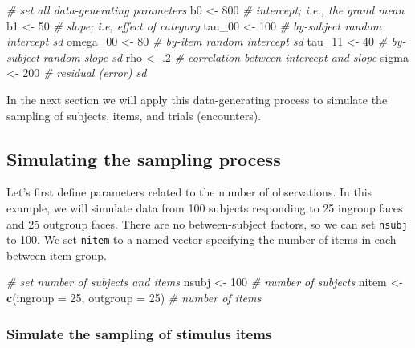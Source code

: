 \documentclass[doc,floatsintext]{apa6}
\newenvironment{Shaded}{\begin{snugshade}}{\end{snugshade}}
\newcommand{\KeywordTok}[1]{\textcolor[rgb]{0.13,0.29,0.53}{\textbf{#1}}}
\newcommand{\DataTypeTok}[1]{\textcolor[rgb]{0.13,0.29,0.53}{#1}}
\newcommand{\DecValTok}[1]{\textcolor[rgb]{0.00,0.00,0.81}{#1}}
\newcommand{\FloatTok}[1]{\textcolor[rgb]{0.00,0.00,0.81}{#1}}
\newcommand{\StringTok}[1]{\textcolor[rgb]{0.31,0.60,0.02}{#1}}
\newcommand{\CommentTok}[1]{\textcolor[rgb]{0.56,0.35,0.01}{\textit{#1}}}
\newcommand{\NormalTok}[1]{#1}
\begin{document}
\begin{Shaded}
\begin{Highlighting}[]
\CommentTok{# set all data-generating parameters}
\NormalTok{b0     <-}\StringTok{ }\DecValTok{800} \CommentTok{# intercept; i.e., the grand mean}
\NormalTok{b1     <-}\StringTok{  }\DecValTok{50} \CommentTok{# slope; i.e, effect of category}
\NormalTok{tau_}\DecValTok{00}\NormalTok{ <-}\StringTok{ }\DecValTok{100} \CommentTok{# by-subject random intercept sd}
\NormalTok{omega_}\DecValTok{00}\NormalTok{ <-}\StringTok{  }\DecValTok{80} \CommentTok{# by-item random intercept sd}
\NormalTok{tau_}\DecValTok{11}\NormalTok{ <-}\StringTok{  }\DecValTok{40} \CommentTok{# by-subject random slope sd}
\NormalTok{rho   <-}\StringTok{  }\FloatTok{.2} \CommentTok{# correlation between intercept and slope}
\NormalTok{sigma <-}\StringTok{ }\DecValTok{200} \CommentTok{# residual (error) sd}
\end{Highlighting}
\end{Shaded}

\noindent In the next section we will apply this data-generating process
to simulate the sampling of subjects, items, and trials (encounters).

\subsection{Simulating the sampling
process}\label{simulating-the-sampling-process}

Let's first define parameters related to the number of observations. In
this example, we will simulate data from 100 subjects responding to 25
ingroup faces and 25 outgroup faces. There are no between-subject
factors, so we can set \texttt{nsubj} to 100. We set \texttt{nitem} to a
named vector specifying the number of items in each between-item group.

\begin{Shaded}
\begin{Highlighting}[]
\CommentTok{# set number of subjects and items}
\NormalTok{nsubj  <-}\StringTok{ }\DecValTok{100} \CommentTok{# number of subjects}
\NormalTok{nitem  <-}\StringTok{ }\KeywordTok{c}\NormalTok{(}\DataTypeTok{ingroup =} \DecValTok{25}\NormalTok{, }\DataTypeTok{outgroup =} \DecValTok{25}\NormalTok{)  }\CommentTok{# number of items}
\end{Highlighting}
\end{Shaded}

\subsubsection{Simulate the sampling of stimulus
items}\label{simulate-the-sampling-of-stimulus-items}
\end{document}
